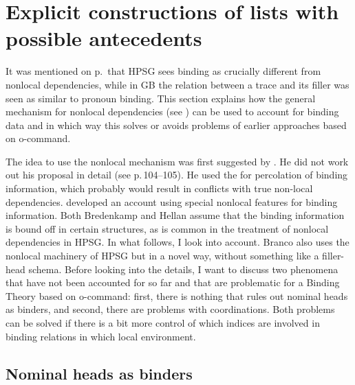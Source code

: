 \documentclass[output=paper,biblatex,babelshorthands,newtxmath,draftmode,colorlinks,citecolor=brown]{langscibook}
\begin{document}
\section{Explicit constructions of lists with possible antecedents}
\label{sec-bt-nonlocal}

It was mentioned on p.\,\pageref{page-traces-binding} that HPSG sees binding as crucially different from nonlocal
dependencies, while in GB the relation between a trace and its filler was seen as similar to pronoun
binding. This section explains how the general mechanism for nonlocal dependencies (see
) can be used to account for binding data and in which way this solves or
avoids problems of earlier approaches based on o-command. 

The idea to use the nonlocal mechanism was first suggested by
\citet[Section~7.2.3]{Bredenkamp96a}. He did not work out his proposal in detail (see 
p.\,104--105). He used the \slashf for percolation of binding information, which probably would
result in conflicts with true non-local dependencies. \citet{Hellan2005a} developed an account using
special nonlocal features for binding information. Both Bredenkamp and Hellan assume that the
binding information is bound off in certain structures, as is common in the treatment of nonlocal
dependencies in HPSG. In what follows, I look into  account. Branco also
uses the nonlocal machinery of HPSG but in a novel way, without something like a filler-head
schema. Before looking into the details, I want to discuss two phenomena that have not been
accounted for so far and that are problematic for a Binding Theory based on o-command: first, there
is nothing that rules out nominal heads as binders, and second, there are problems with
coordinations. Both problems can be solved if there is a bit more control of which indices are
involved in binding relations in which local environment.


\subsection{Nominal heads as binders}
\label{sec-nominal-heads-as-binders}

\end{document}
